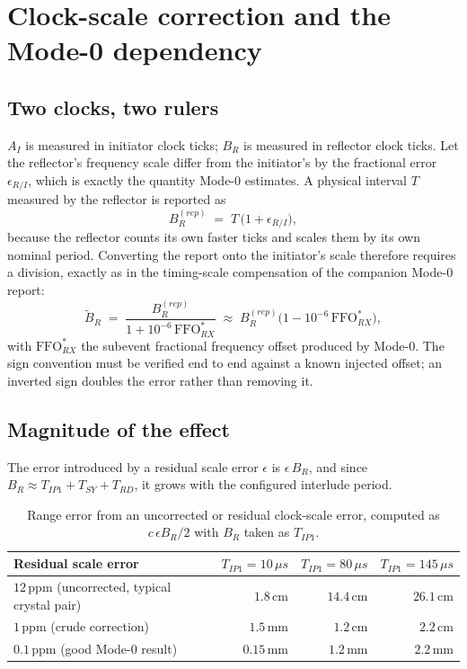 \documentclass[11pt,a4paper]{article}
\newcommand{\us}{\,\ensuremath{\upmu}s}
\newcommand{\FFO}{\mathrm{FFO}}
\newcommand{\Tsy}{T_{SY}}
\newcommand{\Trd}{T_{RD}}
\newcommand{\Tip}{T_{IP1}}
\providecommand{\upmu}{\mu}
\begin{document}
\section{Clock-scale correction and the Mode-0 dependency}
\label{sec:clock}

\subsection{Two clocks, two rulers}

$A_I$ is measured in initiator clock ticks; $B_R$ is measured in reflector clock ticks. Let the
reflector's frequency scale differ from the initiator's by the fractional error $\epsilon_{R/I}$,
which is exactly the quantity Mode-0 estimates. A physical interval $T$ measured by the reflector
is reported as
\begin{equation}
B_R^{(rep)} \;=\; T\,\bigl(1 + \epsilon_{R/I}\bigr),
\label{eq:clockscale}
\end{equation}
because the reflector counts its own faster ticks and scales them by its own nominal period.
Converting the report onto the initiator's scale therefore requires a division, exactly as in the
timing-scale compensation of the companion Mode-0 report:
\begin{equation}
\tilde B_R \;=\; \frac{B_R^{(rep)}}{1 + 10^{-6}\,\FFO^{*}_{RX}}
   \;\approx\; B_R^{(rep)}\bigl(1 - 10^{-6}\,\FFO^{*}_{RX}\bigr),
\label{eq:rescale}
\end{equation}
with $\FFO^{*}_{RX}$ the subevent fractional frequency offset produced by Mode-0. The sign
convention must be verified end to end against a known injected offset; an inverted sign doubles
the error rather than removing it.

\subsection{Magnitude of the effect}

The error introduced by a residual scale error $\epsilon$ is $\epsilon\,B_R$, and since
$B_R \approx \Tip + \Tsy + \Trd$, it grows with the configured interlude period.

\begin{table}[h]
\caption{Range error from an uncorrected or residual clock-scale error, computed as
$c\,\epsilon B_R / 2$ with $B_R$ taken as $\Tip$.}
\label{tab:clockerr}
\centering\small
\begin{tabular}{@{}lrrr@{}}
\toprule
Residual scale error & $\Tip=10\us$ & $\Tip=80\us$ & $\Tip=145\us$ \\
\midrule
$12$\,ppm (uncorrected, typical crystal pair) & $1.8$\,cm & $14.4$\,cm & $26.1$\,cm \\
$1$\,ppm (crude correction) & $1.5$\,mm & $1.2$\,cm & $2.2$\,cm \\
$0.1$\,ppm (good Mode-0 result) & $0.15$\,mm & $1.2$\,mm & $2.2$\,mm \\
\bottomrule
\end{tabular}
\end{table}
\end{document}
